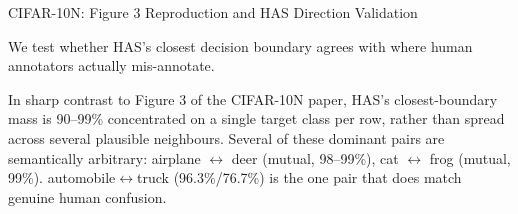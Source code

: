 CIFAR-10N: Figure 3 Reproduction and HAS Direction Validation
\label{sec:extra_cifar10n_direction}

We test whether HAS's closest decision boundary agrees with where human annotators actually
mis-annotate. 
\begin{table}[htbp]
\centering
\caption{HAS closest-boundary matrix (\%): $P(\text{closest\_boundary}=\text{col} \mid \text{clean label}=\text{row})$ }
\label{tab:cifar10n_has_boundary}
\renewcommand{\arraystretch}{1.1}
\end{table}

In sharp contrast to Figure 3 of the CIFAR-10N paper, HAS's closest-boundary mass is 90--99\%
concentrated on a single target class per row, rather than spread across several plausible
neighbours. Several of these dominant pairs are semantically arbitrary: airplane
$\leftrightarrow$ deer (mutual, 98--99\%), cat $\leftrightarrow$ frog (mutual, 99\%).
automobile$\leftrightarrow$truck (96.3\%/76.7\%) is the one pair that does match genuine human
confusion.


